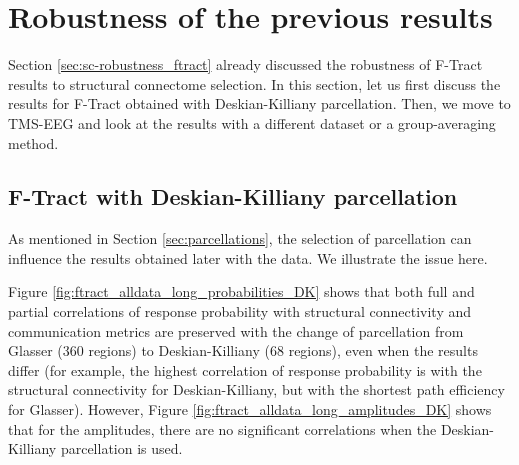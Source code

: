 \section{Robustness of the previous results}

Section \ref{sec:sc-robustness_ftract} already discussed the robustness of F-Tract results to structural connectome selection. In this section, let us first discuss the results for F-Tract obtained with Deskian-Killiany parcellation. Then, we move to TMS-EEG and look at the results with a different dataset or a group-averaging method.

\subsection{F-Tract with Deskian-Killiany parcellation}\label{sec:ftract_dkt}

As mentioned in Section \ref{sec:parcellations}, the selection of parcellation can influence the results obtained later with the data. We illustrate the issue here. 

Figure  \ref{fig:ftract_alldata_long_probabilities_DK} shows that both full and partial correlations of response probability with structural connectivity and communication metrics are preserved with the change of parcellation from Glasser (360 regions) to Deskian-Killiany (68 regions), even when the results differ (for example, the highest correlation of response probability is with the structural connectivity for Deskian-Killiany, but with the shortest path efficiency for Glasser). However, Figure \ref{fig:ftract_alldata_long_amplitudes_DK} shows that for the amplitudes, there are no significant correlations when the Deskian-Killiany parcellation is used.

